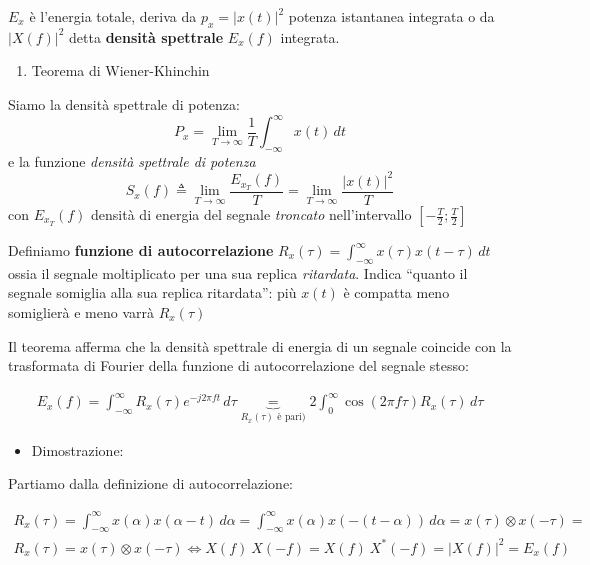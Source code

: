 \documentclass[
  paper=a4,
  ,captions=tableheading
]{scrartcl}
\providecommand{\tightlist}{%
  \setlength{\itemsep}{0pt}\setlength{\parskip}{0pt}}
\begin{document}
\(E_x\) è l'energia totale, deriva da \(p_x = |x(t)|^2\) potenza
istantanea integrata o da \(|X(f)|^2\) detta \textbf{densità spettrale}
\(E_x(f)\) integrata.

\begin{enumerate}
\def\labelenumi{\arabic{enumi}.}
\setcounter{enumi}{26}
\tightlist
\item
  Teorema di Wiener-Khinchin
\end{enumerate}

Siamo la densità spettrale di potenza: \[
P_x = \lim_{T\to \infty} \frac{1}{T}\int_{-\infty}^{\infty} x(t) \,dt 
\] e la funzione \emph{densità spettrale di potenza} \[
S_x(f) \triangleq \lim_{T\to \infty} \frac{E_{x_T}(f)}{T} =\lim_{T\to\infty} \frac{|x(t)|^2}{T} 
\] con \(E_{x_T}(f)\) densità di energia del segnale \emph{troncato}
nell'intervallo \([-\frac{T}{2}; \frac{T}{2}]\)

Definiamo \textbf{funzione di autocorrelazione}
\(R_x(\tau)= \int_{-\infty}^{\infty}x(\tau)x(t-\tau)\,dt\) ossia il
segnale moltiplicato per una sua replica \emph{ritardata}. Indica
``quanto il segnale somiglia alla sua replica ritardata'': più \(x(t)\)
è compatta meno somiglierà e meno varrà \(R_x(\tau)\)

Il teorema afferma che la densità spettrale di energia di un segnale
coincide con la trasformata di Fourier della funzione di
autocorrelazione del segnale stesso:

\begin{gather*}
E_x(f)= \int_{-\infty}^{\infty}R_{x}(\tau) e^{-j2\pi ft}\,d\tau \underbrace{=}_{R_x(\tau) \text{ è pari})} 2\int_{0}^{\infty} \cos(2\pi f\tau)R_x(\tau) \,d\tau
\end{gather*}

\begin{itemize}
\tightlist
\item
  Dimostrazione:
\end{itemize}

Partiamo dalla definizione di autocorrelazione:

\begin{gather*}
R_{x} (\tau) = \int_{-\infty}^{\infty} x(\alpha) x(\alpha -t) \,d\alpha = \int_{-\infty}^{\infty} x(\alpha)x(-(t-\alpha)) \,d\alpha = x(\tau) \otimes x(-\tau) = \\
R_{x} (\tau) =  x(\tau) \otimes x(-\tau) \Longleftrightarrow X(f) \ X(-f) = X(f) \ X^{*}(-f) = |X(f)|^{2} = E_x(f)
\end{gather*}
\end{document}
